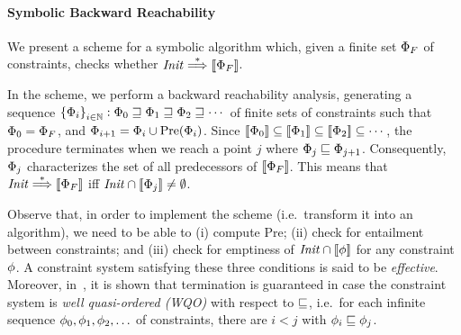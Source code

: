 \paragraph{\bf Symbolic Backward Reachability}
%
We present a scheme for a symbolic algorithm which, given a finite set $\Phi_F$ 
of constraints, checks whether ${\it Init}\stackrel{*}\Longrightarrow[\![{\Phi_F}]\!]$.
%

In the scheme, we perform a backward reachability analysis, generating a sequence 
$\left\{{\Phi}_{i}\right\}_{{i}\in{\mathbb N}}:\Phi_0\sqsupseteq\Phi_1\sqsupseteq\Phi_2\sqsupseteq
\cdots$ of finite sets of constraints such that $\Phi_0=\Phi_F$, and $\Phi_{i+1}=
\Phi_i\cup\text{Pre}({\Phi_i})$.
%
Since $[\![{\Phi_0}]\!]\subseteq[\![{\Phi_1}]\!]\subseteq
[\![{\Phi_2}]\!]\subseteq\cdots$, the procedure terminates when we reach a 
point $j$ where $\Phi_j\sqsubseteq\Phi_{j+1}$.
%
Consequently, $\Phi_j$ characterizes the set of all predecessors of $[\![{
\Phi_F}]\!]$.
%
This means that ${\it Init}\stackrel{*}\Longrightarrow[\![{\Phi_F}]\!]$ iff ${\it Init}\cap
[\![{\Phi_j}]\!]\neq\emptyset$.
%

Observe that, in order to implement the scheme (i.e.\ transform it into an algorithm), we 
need to be able to (i) compute Pre; (ii) check for entailment between constraints; and 
(iii) check for emptiness of ${\it Init}\cap[\![{\phi}]\!]$ for any constraint 
$\phi$.
%
A constraint system satisfying these three conditions is said to be \emph{effective}.
%
Moreover, in~\cite{Parosh:Bengt:Karlis:Tsay:general}, it is shown that termination is 
guaranteed in case the constraint system is \emph{well quasi-ordered (WQO)} with respect 
to $\sqsubseteq$, i.e.\ for each infinite sequence $\phi_0,\phi_1,\phi_2,\ldots$ 
of constraints, there are $i<j$ with $\phi_i\sqsubseteq\phi_j$.
%
